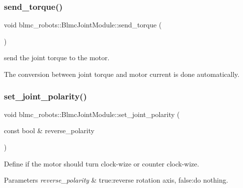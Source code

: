 \subsubsection{\texorpdfstring{send\+\_\+torque()}{send\_torque()}}
{\footnotesize\ttfamily void blmc\+\_\+robots\+::\+Blmc\+Joint\+Module\+::send\+\_\+torque (\begin{DoxyParamCaption}{ }\end{DoxyParamCaption})}



send the joint torque to the motor. 

The conversion between joint torque and motor current is done automatically. \mbox{\label{classblmc__robots_1_1BlmcJointModule_a137da65771a8628db4692e3bfc924f07}} 
\subsubsection{\texorpdfstring{set\+\_\+joint\+\_\+polarity()}{set\_joint\_polarity()}}
{\footnotesize\ttfamily void blmc\+\_\+robots\+::\+Blmc\+Joint\+Module\+::set\+\_\+joint\+\_\+polarity (\begin{DoxyParamCaption}\item[{const bool \&}]{reverse\+\_\+polarity }\end{DoxyParamCaption})}



Define if the motor should turn clock-\/wize or counter clock-\/wize. 


\begin{DoxyParams}{Parameters}
{\em reverse\+\_\+polarity} & true\+:reverse rotation axis, false\+:do nothing. \\
\hline
\end{DoxyParams}
\mbox{\label{classblmc__robots_1_1BlmcJointModule_a464ab2a846630eba6582d09895df2852}} 
